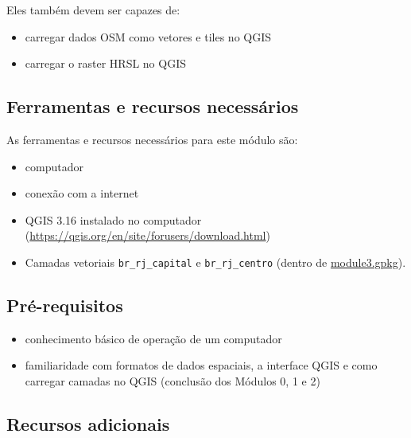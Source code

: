 \documentclass[
  portuguese,
]{krantz}
\providecommand{\tightlist}{%
  \setlength{\itemsep}{0pt}\setlength{\parskip}{0pt}}
\begin{document}
Eles também devem ser capazes de:

\begin{itemize}
\tightlist
\item
  carregar dados OSM como vetores e tiles no QGIS
\item
  carregar o raster HRSL no QGIS
\end{itemize}

\hypertarget{ferramentas-e-recursos-necessuxe1rios-3}{%
\subsection{Ferramentas e recursos necessários}\label{ferramentas-e-recursos-necessuxe1rios-3}}

As ferramentas e recursos necessários para este módulo são:

\begin{itemize}
\tightlist
\item
  computador
\item
  conexão com a internet
\item
  QGIS 3.16 instalado no computador (\url{https://qgis.org/en/site/forusers/download.html})
\item
  Camadas vetoriais \texttt{br\_rj\_capital} e \texttt{br\_rj\_centro} (dentro de \url{module3.gpkg}).
\end{itemize}

\hypertarget{pruxe9-requisitos-3}{%
\subsection{Pré-requisitos}\label{pruxe9-requisitos-3}}

\begin{itemize}
\tightlist
\item
  conhecimento básico de operação de um computador
\item
  familiaridade com formatos de dados espaciais, a interface QGIS e como carregar camadas no QGIS (conclusão dos Módulos 0, 1 e 2)
\end{itemize}

\hypertarget{recursos-adicionais-3}{%
\subsection{Recursos adicionais}\label{recursos-adicionais-3}}
\end{document}
